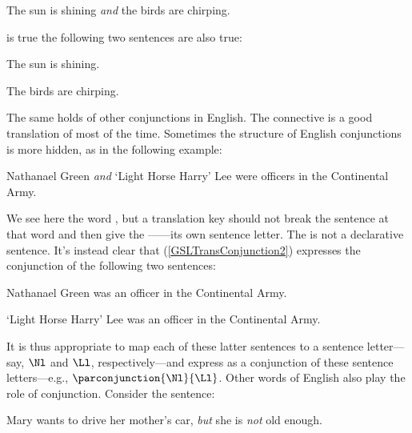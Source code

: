 \begin{menumerate}
	\item\label{GSLTransConjunction1} The sun is shining \emph{and} the birds are chirping.
\end{menumerate}

\noindent{}is true \Iff the following two sentences are also true:

\begin{menumerate}
	\item The sun is shining.
	\item The birds are chirping.
\end{menumerate}

\noindent{}The same holds of other conjunctions in English.  The \GSL{} connective \mention{$\WEDGE$} is a good translation of  most of the time.  Sometimes the structure of English conjunctions is more hidden, as in the following example:

\begin{menumerate}
	\item\label{GSLTransConjunction2} Nathanael Green \emph{and} `Light Horse Harry' Lee were officers in the Continental Army.
\end{menumerate}

\noindent{}We see here the word , but a translation key should not break the sentence at that word and then give the ------its own sentence letter.  The  is not a declarative sentence.  It's instead clear that (\ref{GSLTransConjunction2}) expresses the conjunction of the following two sentences:

\begin{menumerate}
	\item Nathanael Green was an officer in the Continental Army.
	\item `Light Horse Harry' Lee was an officer in the Continental Army.
\end{menumerate}

\noindent{}It is thus appropriate to map each of these latter sentences to a sentence letter---say, $\Nl$ and $\Ll$, respectively---and express  as a conjunction of these sentence letters---e.g., $\parconjunction{\Nl}{\Ll}$.  Other words of English also play the role of conjunction.  Consider the sentence:

\begin{menumerate}
	\item\label{GSLTransConjunction3} Mary wants to drive her mother's car, \emph{but} she is \emph{not} old enough.
\end{menumerate}

